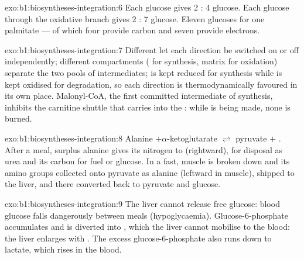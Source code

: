 \begin{solution}{exo:b1:biosyntheses-integration:6}
Each glucose gives 2 : 4 glucose. Each glucose through the
oxidative branch gives 2 : 7 glucose. Eleven glucoses for one
palmitate --- of which four provide carbon and seven provide electrons.
\end{solution}

\begin{solution}{exo:b1:biosyntheses-integration:7}
Different  let each direction be switched on or off
independently; different compartments ( for synthesis, matrix
for oxidation) separate the two pools of intermediates;  is kept
reduced for synthesis while  is kept oxidised for degradation, so
each direction is thermodynamically favoured in its own place.
Malonyl-CoA, the first committed intermediate of synthesis, inhibits
the carnitine shuttle that carries  into the :
while  is being made, none is burned.
\end{solution}

\begin{solution}{exo:b1:biosyntheses-integration:8}
Alanine $+ \alpha$-ketoglutarate $\rightleftharpoons$ pyruvate $+$
. After a  meal, surplus alanine gives its nitrogen to
 (rightward), for disposal as urea and its carbon for fuel or
glucose. In a fast, muscle  is broken down and its amino groups
collected onto pyruvate as alanine (leftward in muscle), shipped to
the liver, and there converted back to pyruvate and glucose.
\end{solution}

\begin{solution}{exo:b1:biosyntheses-integration:9}
The liver cannot release free glucose: blood glucose falls
dangerously between meals (hypoglycaemia). Glucose-6-phosphate
accumulates and is diverted into , which the liver cannot
mobilise to the blood: the liver enlarges with . The excess
glucose-6-phosphate also runs down  to lactate, which rises
in the blood.
\end{solution}


